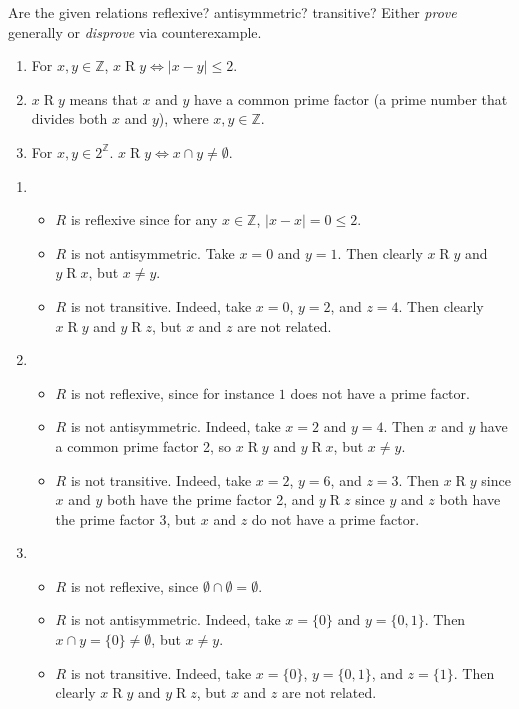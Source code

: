 \documentclass{article}
\newcommand{\Z}{\mathbb{Z}}
\theoremstyle{definition}
\begin{document}
\begin{question}
    Are the given relations reflexive? antisymmetric? transitive? Either \textit{prove} generally or \textit{disprove} via 
    counterexample.
    	\begin{enumerate}
	\item For $x, y \in \Z$,  $x\mathrel{R}y \iff |x - y| \leq 2$. 
	\item  $x\mathrel{R}y$ means that $x$ and $y$ have a common prime factor (a prime number that divides both $x$ and $y$), 
	where $x, y \in \Z$.
	\item For $x, y \in 2^{\Z}$. $x\mathrel{R}y \iff x \cap y \neq \emptyset$.
	\end{enumerate}
\end{question}
\begin{solution}
\begin{enumerate}
	\item
\begin{itemize}
		\item $ R$ is reflexive since for any $x \in \Z$, $|x-x|  = 0 \leq 2$.
		\item $ R$ is not antisymmetric. Take $x = 0$ and $y = 1$. Then clearly $x \mathrel{R}y$ and $y \mathrel{R}x$, but $x \neq y$.
		\item $ R$ is not transitive. Indeed, take $x = 0$, $y = 2$, and $z = 4$. Then clearly $x \mathrel{R}y$ and $y \mathrel{R}z$, but $x$ and $z$ are not related.
	\end{itemize}
	
	\item 
	\begin{itemize}
		\item $ R$ is not reflexive, since for instance $1$ does not have a prime factor.
		\item $ R$ is not antisymmetric. Indeed, take $x = 2$ and $y = 4$. Then $x$ and $y$ have a common prime factor 2, so $x \mathrel{R}y$ and $y \mathrel{R}x$, but $x \neq y$.
		\item $ R$ is not transitive. Indeed, take $x = 2$, $y = 6$, and $z = 3$. Then $x \mathrel{R}y$ since $x$ and $y$ both have the prime factor 2, and $y \mathrel{R}z$ since $y$ and $z$ both have the prime factor 3, but $x$ and $z$ do not have a prime factor.
	\end{itemize}
	
	\item 
	\begin{itemize}
		\item $ R$ is not reflexive, since $\emptyset \cap \emptyset = \emptyset$.
		\item $ R$ is not antisymmetric. Indeed, take $x = \{ 0 \}$ and $y = \{0,1\}$. Then $x \cap y = \{0 \} \neq \emptyset$, but $x \neq y$.
		\item $ R$ is not transitive. Indeed, take $x = \{ 0 \}$, $y = \{0,1\}$, and $z = \{1\}$. Then clearly $x \mathrel{R}y$ and $y \mathrel{R}z$, but $x$ and $z$ are not related.
	\end{itemize}
     \end{enumerate}
\end{solution}
\end{document}
